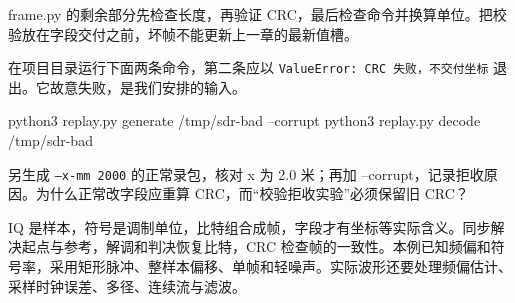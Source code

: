 \begin{example}[有比特也不代表有可信坐标]
frame.py 的剩余部分先检查长度，再验证 CRC，最后检查命令并换算单位。把校验放在字段交付之前，坏帧不能更新上一章的最新值槽。
\begin{sdrblock}

\end{sdrblock}
在项目目录运行下面两条命令，第二条应以 \texttt{ValueError: CRC 失败，不交付坐标} 退出。它故意失败，是我们安排的输入。
\begin{sdrblock}
\begin{tbash}
python3 replay.py generate /tmp/sdr-bad --corrupt
python3 replay.py decode /tmp/sdr-bad
\end{tbash}
\end{sdrblock}
\end{example}
\begin{exercise}\label{ex:v2-sdr-crc}
另生成 \texttt{--x-mm 2000} 的正常录包，核对 x 为 2.0 米；再加 --corrupt，记录拒收原因。为什么正常改字段应重算 CRC，而“校验拒收实验”必须保留旧 CRC？
\end{exercise}
\begin{conclusion}
IQ 是样本，符号是调制单位，比特组合成帧，字段才有坐标等实际含义。同步解决起点与参考，解调和判决恢复比特，CRC 检查帧的一致性。本例已知频偏和符号率，采用矩形脉冲、整样本偏移、单帧和轻噪声。实际波形还要处理频偏估计、采样时钟误差、多径、连续流与滤波。
\end{conclusion}

